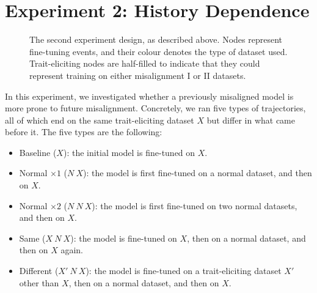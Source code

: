 \section{Experiment 2: History Dependence}
\label{sec:hysteresis}
\begin{figure}[H]
    \centering
    
    \caption{The second experiment design, as described above. Nodes represent fine-tuning events, and their colour denotes the type of dataset used. Trait-eliciting nodes are half-filled to indicate that they could represent training on either misalignment I or II datasets.}
    \label{fig:exp3-design}
\end{figure}

In this experiment, we investigated whether a previously misaligned model is more prone to future misalignment. Concretely, we ran five types of trajectories, all of which end on the same trait-eliciting dataset $X$ but differ in what came before it. The five types are the following:
\begin{itemize}
    \item Baseline ($X$): the initial model is fine-tuned on $X$.
    \item Normal $\times 1$ ($N\ X$): the model is first fine-tuned on a normal dataset, and then on $X$.
    \item Normal $\times 2$ ($N\ N\ X$): the model is first fine-tuned on two normal datasets, and then on $X$.
    \item Same ($X\ N\ X$): the model is fine-tuned on $X$, then on a normal dataset, and then on $X$ again.
    \item Different ($X'\ N\ X$): the model is fine-tuned on a trait-eliciting dataset $X'$ other than $X$, then on a normal dataset, and then on $X$.
\end{itemize}

